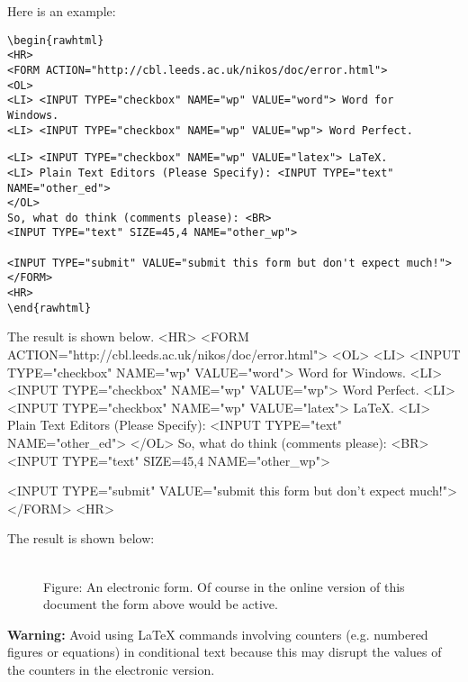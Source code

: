 Here is an example: 
\begin{small}
\begin{verbatim}
\begin{rawhtml}
<HR>
<FORM ACTION="http://cbl.leeds.ac.uk/nikos/doc/error.html">
<OL>
<LI> <INPUT TYPE="checkbox" NAME="wp" VALUE="word"> Word for
Windows.
<LI> <INPUT TYPE="checkbox" NAME="wp" VALUE="wp"> Word Perfect.
\end{verbatim}
\begin{verbatim}
<LI> <INPUT TYPE="checkbox" NAME="wp" VALUE="latex"> LaTeX.
<LI> Plain Text Editors (Please Specify): <INPUT TYPE="text" NAME="other_ed">
</OL>
So, what do think (comments please): <BR>
<INPUT TYPE="text" SIZE=45,4 NAME="other_wp">

<INPUT TYPE="submit" VALUE="submit this form but don't expect much!">
</FORM>
<HR>
\end{rawhtml}
\end{verbatim}
\end{small}
\begin{rawhtml}
The result is shown below. 
<HR>
<FORM ACTION="http://cbl.leeds.ac.uk/nikos/doc/error.html">
<OL>
<LI> <INPUT TYPE="checkbox" NAME="wp" VALUE="word"> Word for
Windows.
<LI> <INPUT TYPE="checkbox" NAME="wp" VALUE="wp"> Word Perfect.
<LI> <INPUT TYPE="checkbox" NAME="wp" VALUE="latex"> LaTeX.
<LI> Plain Text Editors (Please Specify): <INPUT TYPE="text" NAME="other_ed">
</OL>
So, what do think (comments please): <BR>
<INPUT TYPE="text" SIZE=45,4 NAME="other_wp">

<INPUT TYPE="submit" VALUE="submit this form but don't expect much!">
</FORM>
<HR>
\end{rawhtml}

\begin{latexonly}
The result is shown below:
\begin{figure}[tbh]
    \begin{center}
     \\
     Figure: An electronic form. Of course in the online version of this
document the form above would be active.
    \end{center}
\end{figure}
\end{latexonly}

{\bf Warning:} Avoid using LaTeX commands involving counters (e.g.
numbered figures or equations) in conditional text because this may 
disrupt the values of the counters in the electronic version.

